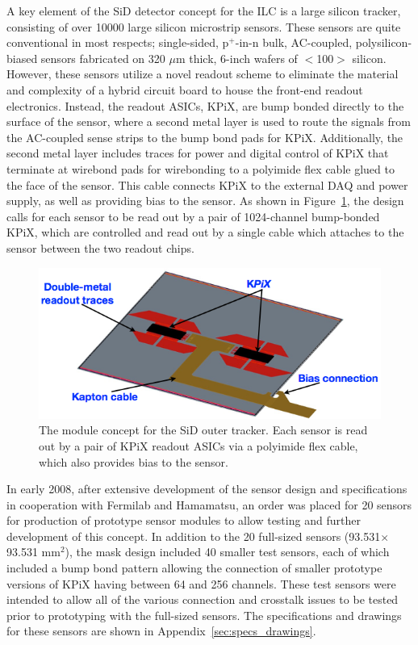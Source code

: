 \documentclass[prc,12pt,nofootinbib,letterpaper]{revtex4}
\begin{document}
A key element of the SiD detector concept for the ILC is a large silicon tracker, consisting of over 10000 large silicon microstrip sensors. These sensors are quite conventional in most respects; single-sided, p$^+$-in-n bulk, AC-coupled, polysilicon-biased sensors fabricated on 320 $\mu$m thick,  6-inch wafers of $<$100$>$ silicon.  However, these sensors utilize a novel readout scheme to eliminate the material and complexity of a hybrid circuit board to house the front-end readout electronics.  Instead, the readout ASICs, KPiX, are bump bonded directly to the surface of the sensor, where a second metal layer is used to route the signals from the AC-coupled sense strips to the bump bond pads for KPiX.  Additionally, the second metal layer includes traces for power and digital control of KPiX that terminate at wirebond pads for wirebonding to a polyimide flex cable glued to the face of the sensor. This cable connects KPiX to the external DAQ and power supply, as well as providing bias to the sensor.  As shown in Figure~\ref{fig:module}, the design calls for each sensor to be read out by a pair of 1024-channel bump-bonded KPiX, which are controlled and read out by a single cable which attaches to the sensor between the two readout chips.
\begin{figure}[htbp]
\begin{center}
    \includegraphics[width=\textwidth]{figures/module}
\caption{The module concept for the SiD outer tracker.  Each sensor is read out by a pair of KPiX readout ASICs via a polyimide flex cable, which also provides bias to the sensor.}
\label{fig:module}
\end{center}
\end{figure}
In early 2008, after extensive development of the sensor design and specifications in cooperation with Fermilab and Hamamatsu, an order was placed for 20 sensors for production of prototype sensor modules to allow testing and further development of this concept.  In addition to the 20 full-sized sensors (93.531$\times$93.531 mm$^2$), the mask design included 40 smaller test sensors, each of which included a bump bond pattern allowing the connection of smaller prototype versions of KPiX having between 64 and 256 channels.  These test sensors were intended to allow all of the various connection and crosstalk issues to be tested prior to prototyping with the full-sized sensors.  The specifications and drawings for these sensors are shown in Appendix~\ref{sec:specs_drawings}.
\end{document}
